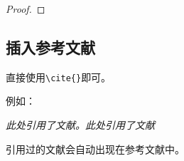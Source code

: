 \documentclass[12pt,hyperref,a4paper,UTF8]{ctexart}
\begin{document}
\begin{Corollary}
\end{Corollary}

\begin{Proposition}
\end{Proposition}

\begin{Definition}
\end{Definition}

\begin{Example}
\end{Example}

\begin{proof}
\end{proof}

\subsection{插入参考文献}
直接使用\verb|\cite{}|即可。

例如：

\textit{ 此处引用了文献\cite{OFDMAbackscatter}。此处引用了文献\cite{DigiScatter}}

引用过的文献会自动出现在参考文献中。

\end{document}
